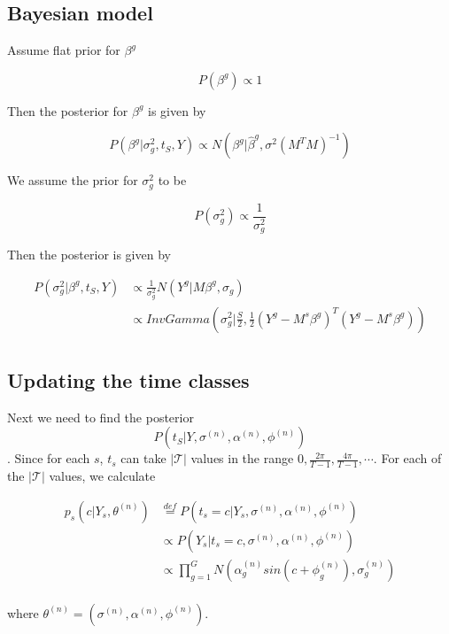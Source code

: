 \documentclass[11pt]{article}
\begin{document}
\subsection{Bayesian model}

Assume flat prior for $\beta^g$

$$ P(\beta^{g}) \propto 1 $$

Then the posterior for $\beta^g$ is given by 

$$ P(\beta^{g} | \sigma^2_g, t_S, Y ) \propto N(\beta^{g} | \hat{\beta}^{g}, \sigma^2 (M^{T}M)^{-1}) $$ 

We assume the prior for $\sigma^2_{g}$ to be 

$$ P(\sigma^2_{g}) \propto \frac{1}{\sigma^2_{g}} $$

Then the posterior is given by 

\begin{align*}
P(\sigma^2_{g} | \beta^{g}, t_{S}, Y) & \propto  \frac{1}{\sigma^2_{g}} N \left ( Y^{g} | M \beta^{g}, \sigma_{g}  \right)  \\
\qquad  &  \propto InvGamma \left ( \sigma^{2}_{g} | \frac{S}{2}, \frac{1}{2} (Y^{g} - M^{s}\beta^{g})^{T} (Y^{g} - M^{s}\beta^{g}) \right) \\
\end{align*}

\subsection{Updating the time classes}

Next we need to find the posterior $$ P(t_S | Y, \sigma^{(n)}, \alpha^{(n)}, \phi^{(n)}) $$. Since for each $s$, $t_s$ can take $ | \mathcal{T} | $ values in the range $0, \frac{2 \pi}{T-1},  \frac{4 \pi}{T-1}, \cdots $. For each of the $| \mathcal{T} |$ values, we calculate 

\begin{align*}
p_s (c | Y_s, \theta^{(n)})  & \stackrel{def}{=} P \left (t_s = c |  Y_s, \sigma^{(n)}, \alpha^{(n)}, \phi^{(n)} \right )  \\
					& \propto P(Y_s | t_s =c,  \sigma^{(n)}, \alpha^{(n)}, \phi^{(n)}) \\
				        & \propto  \prod_{g=1}^{G} N \left ( \alpha^{(n)}_g sin (c + \phi^{(n)}_g), \sigma^{(n)}_{g} \right ) \\
\end{align*}

where $\theta^{(n)} = \left (\sigma^{(n)}, \alpha^{(n)}, \phi^{(n)} \right )$. \\[2 pt]
\end{document}
